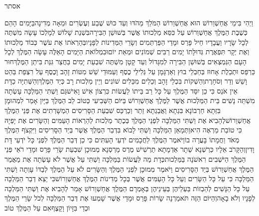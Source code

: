 \documentclass[../main/main.tex]{subfiles}
\begin{document}
\thispagestyle{empty}
\Incipit{}אסתר
\cleardoublepage
\RTLmulticolcolumns
\begin{multicols*}{\ncols}
וַיְהִי בִּימֵי אֲחַשְׁוֵרוֹשׁ הוּא אֲחַשְׁוֵרוֹשׁ הַמֹּלֵךְ מֵהֹדּוּ וְעַד כּוּשׁ שֶׁבַע וְעֶשְׂרִים וּמֵאָה מְדִינָה\PreVerseSpace{}בַּיָּמִים הָהֵם כְּשֶׁבֶת הַמֶּלֶךְ אֲחַשְׁוֵרוֹשׁ עַל כִּסֵּא מַלְכוּתוֹ אֲשֶׁר בְּשׁוּשַׁן הַבִּירָה\PreVerseSpace{}בִּשְׁנַת שָׁלוֹשׁ לְמָלְכוֹ עָשָׂה מִשְׁתֶּה לְכָל שָׂרָיו וַעֲבָדָיו חֵיל פָּרַס וּמָדַי הַפַּרְתְּמִים וְשָׂרֵי הַמְּדִינוֹת לְפָנָיו\PreVerseSpace{}בְּהַרְאֹתוֹ אֶת עֹשֶׁר כְּבוֹד מַלְכוּתוֹ וְאֶת יְקָר תִּפְאֶרֶת גְּדוּלָּתוֹ יָמִים רַבִּים שְׁמוֹנִים וּמְאַת יוֹם\PreVerseSpace{}וּבִמְלוֹאת הַיָּמִים הָאֵלֶּה עָשָׂה הַמֶּלֶךְ לְכָל הָעָם הַנִּמְצְאִים בְּשׁוּשַׁן הַבִּירָה לְמִגָּדוֹל וְעַד קָטָן מִשְׁתֶּה שִׁבְעַת יָמִים בַּחֲצַר גִּנַּת בִּיתַן הַמֶּלֶךְ\PreVerseSpace{}חוּר כַּרְפַּס וּתְכֵלֶת אָחוּז בְּחַבְלֵי בוּץ וְאַרְגָּמָן עַל גְּלִילֵי כֶסֶף וְעַמּוּדֵי שֵׁשׁ מִטּוֹת זָהָב וָכֶסֶף עַל רִצְפַת בַּהַט וָשֵׁשׁ וְדַר וְסֹחָרֶת\PreVerseSpace{}וְהַשְׁקוֹת בִּכְלֵי זָהָב וְכֵלִים מִכֵּלִים שׁוֹנִים וְיֵין מַלְכוּת רָב כְּיַד הַמֶּלֶךְ\PreVerseSpace{}וְהַשְּׁתִיָּה כַדָּת אֵין אֹנֵס כִּי כֵן יִסַּד הַמֶּלֶךְ עַל כָּל רַב בֵּיתוֹ לַעֲשׂוֹת כִּרְצוֹן אִישׁ וָאִישׁ\PreVerseSpace{}גַּם וַשְׁתִּי הַמַּלְכָּה עָשְׂתָה מִשְׁתֵּה נָשִׁים בֵּית הַמַּלְכוּת אֲשֶׁר לַמֶּלֶךְ אֲחַשְׁוֵרוֹשׁ \ClosedSection{}בַּיּוֹם הַשְּׁבִיעִי כְּטוֹב לֵב הַמֶּלֶךְ בַּיָּיִן אָמַר לִמְהוּמָן בִּזְּתָא חַרְבוֹנָא בִּגְתָא וַאֲבַגְתָא זֵתַר וְכַרְכַּס שִׁבְעַת הַסָּרִיסִים הַמְשָׁרְתִים אֶת פְּנֵי הַמֶּלֶךְ אֲחַשְׁוֵרוֹשׁ\PreVerseSpace{}לְהָבִיא אֶת וַשְׁתִּי הַמַּלְכָּה לִפְנֵי הַמֶּלֶךְ בְּכֶתֶר מַלְכוּת לְהַרְאוֹת הָעַמִּים וְהַשָּׂרִים אֶת יָפְיָהּ כִּי טוֹבַת מַרְאֶה הִיא\PreVerseSpace{}וַתְּמָאֵן הַמַּלְכָּה וַשְׁתִּי לָבוֹא בִּדְבַר הַמֶּלֶךְ אֲשֶׁר בְּיַד הַסָּרִיסִים וַיִּקְצֹף הַמֶּלֶךְ מְאֹד וַחֲמָתוֹ בָּעֲרָה בוֹ\PreVerseSpace{}וַיֹּאמֶר הַמֶּלֶךְ לַחֲכָמִים יֹדְעֵי הָעִתִּים כִּי כֵן דְּבַר הַמֶּלֶךְ לִפְנֵי כָּל יֹדְעֵי דָּת וָדִין\PreVerseSpace{}וְהַקָּרֹב אֵלָיו כַּרְשְׁנָא שֵׁתָר אַדְמָתָא תַרְשִׁישׁ מֶרֶס מַרְסְנָא מְמוּכָן שִׁבְעַת שָׂרֵי פָּרַס וּמָדַי רֹאֵי פְּנֵי הַמֶּלֶךְ הַיֹּשְׁבִים רִאשֹׁנָה בַּמַּלְכוּת\PreVerseSpace{}כְּדָת מַה לַּעֲשׂוֹת בַּמַּלְכָּה וַשְׁתִּי עַל אֲשֶׁר לֹא עָשְׂתָה אֶת מַאֲמַר הַמֶּלֶךְ אֲחַשְׁוֵרוֹשׁ בְּיַד הַסָּרִיסִים \ClosedSection{}וַיֹּאמֶר מְמוּכָן\SubEnd{} לִפְנֵי הַמֶּלֶךְ וְהַשָּׂרִים לֹא עַל הַמֶּלֶךְ לְבַדּוֹ עָוְתָה וַשְׁתִּי הַמַּלְכָּה כִּי עַל כָּל הַשָּׂרִים וְעַל כָּל הָעַמִּים אֲשֶׁר בְּכָל מְדִינוֹת הַמֶּלֶךְ אֲחַשְׁוֵרוֹשׁ\PreVerseSpace{}כִּי יֵצֵא דְבַר הַמַּלְכָּה עַל כָּל הַנָּשִׁים לְהַבְזוֹת בַּעְלֵיהֶן בְּעֵינֵיהֶן בְּאָמְרָם הַמֶּלֶךְ אֲחַשְׁוֵרוֹשׁ אָמַר לְהָבִיא אֶת וַשְׁתִּי הַמַּלְכָּה לְפָנָיו וְלֹא בָאָה\PreVerseSpace{}וְהַיּוֹם הַזֶּה תֹּאמַרְנָה שָׂרוֹת פָּרַס וּמָדַי אֲשֶׁר שָׁמְעוּ אֶת דְּבַר הַמַּלְכָּה לְכֹל שָׂרֵי הַמֶּלֶךְ וּכְדַי בִּזָּיוֹן וָקָצֶף\PreVerseSpace{}אִם עַל הַמֶּלֶךְ טוֹב 
\end{multicols*}
\end{document}
